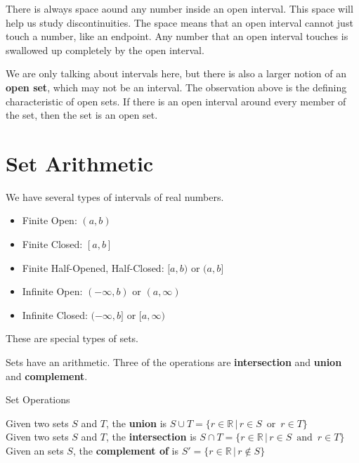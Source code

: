 \documentclass{ximera}
\begin{document}
There is always space aound any number inside an open interval.  This space will help us study discontinuities.  The space means that an open interval cannot just touch a number, like an endpoint.  Any number that an open interval touches is swallowed up completely by the open interval.


We are only talking about intervals here, but there is also a larger notion of an \textbf{open set}, which may not be an interval.  The observation above is the defining characteristic of open sets.  If there is an open interval around every member of the set, then the set is an open set.






\section{Set Arithmetic}


We have several types of intervals of real numbers.


\begin{itemize}
\item Finite Open:   $(a, b)$
\item Finite Closed: $[a, b]$
\item Finite Half-Opened, Half-Closed:  $[a, b)$  or $(a,b]$ \\

\item Infinite Open: $(-\infty, b)$ or $(a, \infty)$
\item Infinite Closed: $(-\infty, b]$ or $[a, \infty)$

\end{itemize}

These are special types of sets.


Sets have an arithmetic. Three of the operations are \textbf{intersection} and \textbf{union} and \textbf{complement}.



\begin{definition} Set Operations


Given two sets $S$ and $T$, the \textbf{union} is $S \cup T = \{ r \in \mathbb{R} \, | \, r \in S \, \text{ or } \, r \in T    \}$ \\

Given two sets $S$ and $T$, the \textbf{intersection} is $S \cap T = \{ r \in \mathbb{R} \, | \, r \in S \, \text{ and } \, r \in T    \}$ \\
 
Given an sets $S$, the \textbf{complement of} is $S'  = \{ r \in \mathbb{R} \, | \, r \not\in S  \}$ 


\end{definition}
\end{document}
